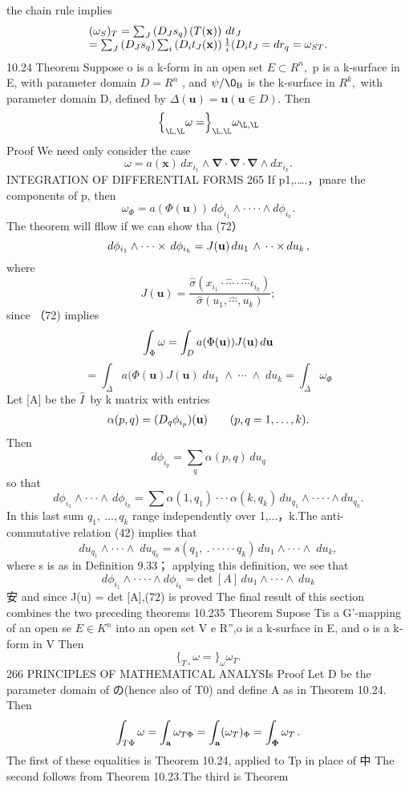 the chain rule implies $$ \begin{array}{l c r}{{(\omega_{S})_{T}=\sum_{J}\left(D_{J}s_{q}\right)\left(T({\bf x})\right)\,d t_{J}}}\\ {{=\sum_{J}\left(D_{J}s_{q}\right)\sum_{i}\left(D_{i}t_{J}({\bf x})\right)\frac{1}{i} (D_{i}t_{J}=d r_{q}=\omega_{S T}.}}\end{array} $$ 10.24 Theorem Suppose o is a k-form in an open set $E\subset R^{n},$ p is a k-surface in E, with parameter domain $\scriptstyle D=R^{n}$ , and $\mathbf{\psi}/\O_{\mathrm{B}}$ is the k-surface in $R^{k},$ with parameter domain D, defined by $\Delta({\mathbf{u}})={\mathbf{u}}({\mathbf{u}}\in D).$ Then $$ \Bigr\{_{\L,\L}\omega=\Bigr\}_{\L,\L}\omega_{\L,\L} $$ Proof We need only consider the case $$ \omega=a(\mathbf{x})\,d x_{i_{1}}\wedge\mathbf{\nabla}\cdot\mathbf{\nabla}\cdot\mathbf{\nabla}\wedge d x_{i_{k}}. $$INTEGRATION OF DIFFERENTIAL FORMS 265 If p1,.….，pnare the components of p, then $$ \omega_{\Phi}=a(\Phi(\mathbf{u}))\,d\phi_{i_{1}}\wedge\mathbf{\cdot}\cdot\cdot\cdot\wedge\ d\phi_{i_{k}}. $$ The theorem will fllow if we can show tha (72） $$ d\phi_{i_{1}}\wedge\cdot\cdot\cdot\times\,d\phi_{i_{k}}=J({\bf u})\,d u_{1}\,\wedge\,\cdot\cdot\times\,d u_{k}\,, $$ where $$ J(\mathbf{u})={\frac{{\hat{\sigma}}(x_{i_{1}}\cdot\mathbf{\hat{\cdots}}\cdot\mathbf{\hat{\cdots}}\iota_{i_{k}})}{{\hat{\sigma}}(u_{1},\mathbf{\hat{\cdots}},u_{k})}}; $$ since （72) implies $$ \int_{\Phi}\omega=\int_{D}a(\Phi({\bf u}))J({\bf u})\,d{\bf u} $$ $$ =\int_{\Delta}a(\Phi(\mathbf{u})J(\mathbf{u})\;d u_{1}\;\wedge\;\cdots\;\wedge\;d u_{k}=\int_{\Delta}\omega_{\Phi} $$ Let [A] be the ${\hat{I}}\,\!$ by k matrix with entries $$ \begin{array}{l l}{{\alpha(p,q)=(D_{q}\phi_{i_{p}})({\bf u})\qquad(p,q=1,\ldots,k).}}\end{array} $$ Then $$ d\phi_{i_{p}}=\sum_{q}\alpha(p,q)\,d u_{q} $$ so that $$ d\phi_{i_{1}}\wedge\cdot\cdot\cdot\wedge\,d\phi_{i_{k}}=\sum\alpha(1,q_{1})\cdot\cdot\cdot\alpha(k,q_{k})\,d u_{q_{1}}\wedge\cdot\cdot\cdot\cdot\wedge\,d u_{q_{k}}. $$ In this last sum $q_{1},\ \ldots,q_{k}$ range independently over 1,...，k.The anti- commutative relation (42) implies that $$ d u_{q_{1}}\wedge\cdot\cdot\cdot\wedge\;d u_{q_{k}}=s(q_{1},\ .\cdot\cdot\cdot\cdot\cdot q_{k})\,d u_{1}\wedge\cdot\cdot\cdot\wedge\;d u_{k}, $$ where s is as in Definition 9.33； applying this definition, we see that $$ d\phi_{i_{1}}\wedge\cdot\cdot\cdot\cdot\wedge\ d\phi_{i_{k}}=\mathrm{det}\ [A]\,d u_{1}\wedge\cdot\cdot\cdot\wedge\ d u_{k} $$ 安 and since J(u) = det [A],(72) is proved The final result of this section combines the two preceding theorems 10.235 Theorem Supose Tis a G'-mapping of an open se $\scriptstyle E\in K^{n}$ into an open set V e R”,o is a k-surface in E, and o is a k-form in V Then $$ \Bigr\{_{T\circ}\omega=\Bigr\}_{\omega}\omega_{T}. $$266 PRINCIPLES OF MATHEMATICAL ANALYSIs Proof Let D be the parameter domain of の(hence also of T0) and define A as in Theorem 10.24. Then $$ \int_{T\Phi}\omega=\int_{\bf a}\omega_{T\Phi}=\int_{\bf a}(\omega_{T})_{\Phi}=\int_{\bf\Phi}\omega_{T}\,. $$ The first of these equalities is Theorem 10.24, applied to Tp in place of 中 The second follows from Theorem 10.23.The third is Theorem 